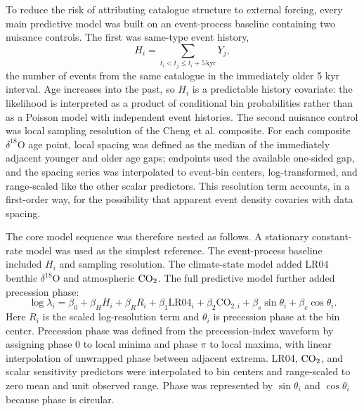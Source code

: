 \documentclass[11pt]{article}
\begin{document}
To reduce the risk of attributing catalogue structure to external forcing, every main predictive model was built on an event-process baseline containing two nuisance controls. The first was same-type event history,
\[
H_i=\sum_{t_i<t_j\leq t_i+5\,\mathrm{kyr}} Y_j ,
\]
the number of events from the same catalogue in the immediately older 5 kyr interval. Age increases into the past, so \(H_i\) is a predictable history covariate: the likelihood is interpreted as a product of conditional bin probabilities rather than as a Poisson model with independent event histories. The second nuisance control was local sampling resolution of the Cheng et al. composite. For each composite \(\delta^{18}\mathrm{O}\) age point, local spacing was defined as the median of the immediately adjacent younger and older age gaps; endpoints used the available one-sided gap, and the spacing series was interpolated to event-bin centers, log-transformed, and range-scaled like the other scalar predictors. This resolution term accounts, in a first-order way, for the possibility that apparent event density covaries with data spacing.

The core model sequence was therefore nested as follows. A stationary constant-rate model was used as the simplest reference. The event-process baseline included \(H_i\) and sampling resolution. The climate-state model added LR04 benthic \(\delta^{18}\mathrm{O}\) and atmospheric \(\ce{CO2}\). The full predictive model further added precession phase:
\[
\log \lambda_i
= \beta_0
+\beta_H H_i
+\beta_R R_i
+\beta_1 \mathrm{LR04}_i
+\beta_2 \mathrm{CO}_{2,i}
+\beta_s \sin\theta_i
+\beta_c \cos\theta_i .
\]
Here \(R_i\) is the scaled log-resolution term and \(\theta_i\) is precession phase at the bin center. Precession phase was defined from the precession-index waveform \citep{laskar2004long} by assigning phase \(0\) to local minima and phase \(\pi\) to local maxima, with linear interpolation of unwrapped phase between adjacent extrema. LR04, \(\ce{CO2}\), and scalar sensitivity predictors were interpolated to bin centers and range-scaled to zero mean and unit observed range. Phase was represented by \(\sin\theta_i\) and \(\cos\theta_i\) because phase is circular.
\end{document}
